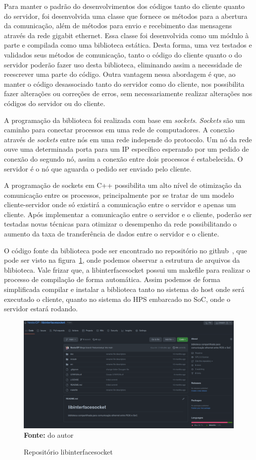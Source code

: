 Para manter o padrão do desenvolvimentos dos códigos tanto do cliente quanto do servidor, foi desenvolvida uma classe que fornece os métodos para a abertura da comunicação, além de métodos para envio e recebimento das mensagens através da rede gigabit ethernet. Essa classe foi desenvolvida como um módulo à parte e compilada como uma biblioteca estática. Desta forma, uma vez testados e validados seus  métodos de comunicação, tanto o código do cliente quanto o do servidor poderão fazer uso desta biblioteca, eliminando assim a necessidade de reescrever uma parte do código. Outra vantagem nessa abordagem é que, ao manter o código desassociado tanto do servidor como do cliente, nos possibilita fazer alterações ou correções de erros, sem necessariamente realizar alterações nos códigos do servidor ou do cliente.

A programação da biblioteca foi realizada com base em \textit{sockets}. \textit{Sockets} são um caminho para conectar processos em uma rede de computadores. A conexão através de \textit{sockets} entre nós em uma rede independe do protocolo. Um nó da rede ouve uma determinada porta para um IP específico esperando por um pedido de conexão do segundo nó, assim a conexão entre dois processos é estabelecida. O servidor é o nó que aguarda o pedido ser enviado pelo cliente.

A programação de sockets em C++ possibilita um alto nível de otimização da comunicação entre os processos, principalmente por se tratar de um modelo cliente-servidor onde só existirá a comunicação entre o servidor e apenas um cliente. Após implementar a comunicação entre o servidor e o cliente, poderão ser testadas novas técnicas para otimizar o desempenho da rede possibilitando o aumento da taxa de transferência de dados entre o servidor e o cliente.

O código fonte da biblioteca pode ser encontrado no repositório no github~\cite{Pereira-Neto-Biblioteca}, que pode ser visto na figura~\ref{fig:gitlib}, onde podemos observar a estrutura de arquivos da blibioteca. Vale frizar que, a libinterfacesocket possui um makefile para realizar o processo de compilação de forma automática. Assim podemos de forma simplificada compilar e instalar a biblioteca tanto no sistema do host onde será executado o cliente, quanto no sistema do HPS embarcado no SoC, onde o servidor estará rodando. 

\begin{figure}[ht]
	\caption{Repositório libinterfacesocket}
	\begin{center}
		\includegraphics[scale=0.26]{imagens/git_libinterfacesocket.png}\\
		{\small \textbf{Fonte:} do autor}
    \end{center}\label{fig:gitlib}
\end{figure}
